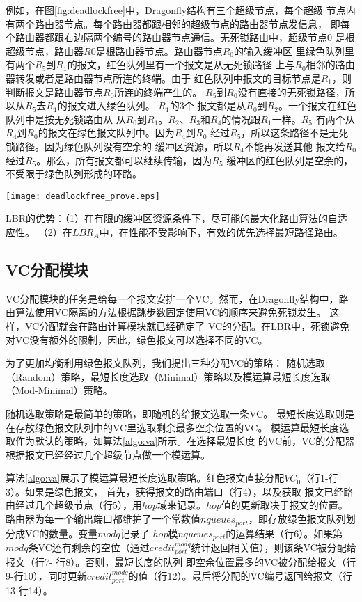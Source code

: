 例如，在图\ref{fig:deadlockfree}中，Dragonfly结构有三个超级节点，每个超级
节点内有两个路由器节点。每个路由器都跟相邻的超级节点的路由器节点发信息，
即每个路由器都跟右边隔两个编号的路由器节点通信。无死锁路由中，超级节点$0$ 是根超级节点，路由器$R0$是根路由器节点。路由器节点$R_0$的输入缓冲区
里绿色队列里有两个$R_5$到$R_1$的报文，红色队列里有一个报文是从无死锁路径
上与$R_0$相邻的路由器转发或者是路由器节点所连的终端。由于
红色队列中报文的目标节点是$R_1$，则判断报文是路由器节点$R_0$所连的终端产生的。
$R_5$到$R_0$没有直接的无死锁路径，所以从$R_5$去$R_1$的报文进入绿色队列。 $R_1$的3个
报文都是从$R_0$到$R_2$。一个报文在红色队列中是按无死锁路由从
从$R_0$到$R_1$。$R_2$、$R_3$和$R_4$的情况跟$R_1$一样。$R_5$
有两个从$R_4$到$R_0$的报文在绿色报文队列中。因为$R_4$到$R_0$
经过$R_5$，所以这条路径不是无死锁路径。因为绿色队列没有空余的
缓冲区资源，所以$R_4$不能再发送其他
报文给$R_0$经过$R_5$。那么，所有报文都可以继续传输，因为$R_5$
缓冲区的红色队列是空余的，不受限于绿色队列形成的环路。

\begin{figure*}[t]
  \centering
  \texttt{[image: deadlockfree\_prove.eps]}
  \caption{Dragonfly的死锁避免机制范例}
  \label{fig:deadlockfree}
\end{figure*}

LBR的优势：（1）在有限的缓冲区资源条件下，尽可能的最大化路由算法的自适应性。
（2）在$LBR_A$中，在性能不受影响下，有效的优先选择最短路径路由。

\subsection{VC分配模块}


VC分配模块的任务是给每一个报文安排一个VC。然而，在Dragonfly结构中，路由算法使用VC隔离的方法根据跳步数固定使用VC的顺序来避免死锁发生。
这样，VC分配就会在路由计算模块就已经确定了
VC的分配。在LBR中，死锁避免对VC没有额外的限制，因此，绿色报文可以选择不同的VC。

为了更加均衡利用绿色报文队列，我们提出三种分配VC的策略：
随机选取（Random）策略，最短长度选取（Minimal）策略以及模运算最短长度选取（Mod-Minimal）策略。

随机选取策略是最简单的策略，即随机的给报文选取一条VC。
最短长度选取则是在存放绿色报文队列中的VC里选取剩余最多空余位置的VC。
模运算最短长度选取作为默认的策略，如算法\ref{algo:va}所示。在选择最短长度
的VC前，VC的分配器根据报文已经经过几个超级节点做一个模运算。

算法\ref{algo:va}展示了模运算最短长度选取策略。红色报文直接分配$VC_0$（行1-行3）。如果是绿色报文，
首先，获得报文的路由端口（行4），以及获取
报文已经路由经过几个超级节点（行5），用$hop$域来记录。$hop$值的更新取决于报文的位置。路由器为每一个输出端口都维护了一个常数值$nqueues_{port}$，即存放绿色报文队列划分成VC的数量。变量$modq$记录了
$hop$模$nqueues_{port}$的运算结果（行6）。如果第$modq$条VC还有剩余的空位（通过$credit_{port}^{modq}$统计返回相关值），则该条VC被分配给报文（行7- 行8）。否则，最短长度的队列
即空余位置最多的VC被分配给报文（行9-行10），同时更新$credit_{port}^{modq}$的值（行12）。最后将分配的VC编号返回给报文（行13-行14）。

